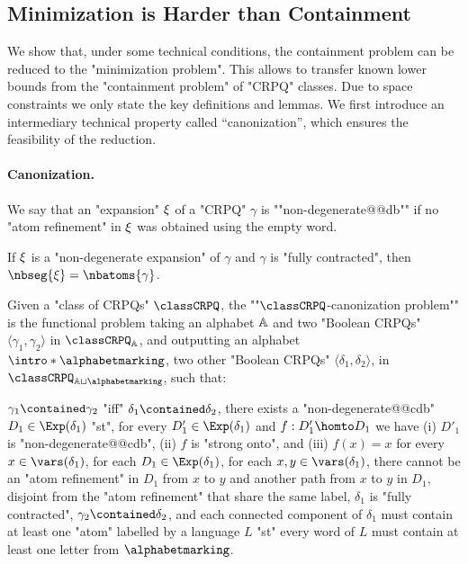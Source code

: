\subsection{Minimization is Harder than Containment}
We show that, under some technical conditions, the containment problem can be reduced to the "minimization problem". This allows to transfer known lower bounds from the "containment problem" of "CRPQ" classes. Due to space constraints we only state the key definitions and lemmas.
We first introduce an intermediary technical property called ``canonization'',
which ensures the feasibility of the reduction.

\paragraph*{Canonization.}
We say that an "expansion" $\xi$ of a "CRPQ" $\gamma$ is \AP""non-degenerate@@db""
if no "atom refinement" in $\xi$ was obtained using the empty word.

\begin{fact}
	\AP\label{fact:nb-seg-expansion}
	If $\xi$ is a "non-degenerate expansion" of $\gamma$ and
	$\gamma$ is "fully contracted", then $\nbseg{\anexpansion} = \nbatoms{\gamma}$.
\end{fact}

Given a "class of CRPQs" $\classCRPQ$, the \AP""$\classCRPQ$-canonization problem""
is the functional problem taking an alphabet $\mathbb{A}$
and two "Boolean CRPQs" $\langle \gamma_1,\gamma_2\rangle$ in $\classCRPQ_{\A}$,
and outputting an alphabet \AP$\intro*\alphabetmarking$, two other "Boolean CRPQs" $\langle \delta_1, \delta_2 \rangle$, in $\classCRPQ_{\A\sqcup \alphabetmarking}$,
such that:
\begin{description}
	\itemAP[\intro*\axiomCanonMonotonicity{}:] \axiomsCanon
		$\gamma_1 \contained \gamma_2$ "iff" $\delta_1 \contained \delta_2$,
	\itemAP[\intro*\axiomCanonCore{}:]
		there exists a "non-degenerate@@cdb" 
		$D_1 \in \Exp(\delta_1)$ "st", for every $D'_1 \in \Exp(\delta_1)$ and $f: D'_1 \homto D_1$ we have (i) $D'_1$ is "non-degenerate@@cdb", (ii) $f$ is "strong onto", and (iii)  $f(x)=x$ for every $x\in \vars(\delta_1)$,
	\itemAP[\intro*\axiomCanonNonRed{}:] for each $D_1 \in \Exp(\delta_1)$,
		for each $x,y \in \vars(\delta_1)$, there cannot be an "atom refinement" in $D_1$
		from $x$ to $y$ and another path from $x$ to $y$ in $D_1$, disjoint from the "atom refinement" that share the same label,
	\itemAP[\intro*\axiomCanonContracted{}:] $\delta_1$ is "fully contracted",
	\itemAP[\intro*\axiomCanonContainment{}:] $\gamma_2 \contained \delta_2$, and 
	\itemAP[\intro*\axiomCanonMarking{}:] each connected component of $\delta_1$ must contain at least one "atom"
	labelled by a language $L$ "st" every word of $L$ must contain at least one letter from $\alphabetmarking$.
\end{description}


